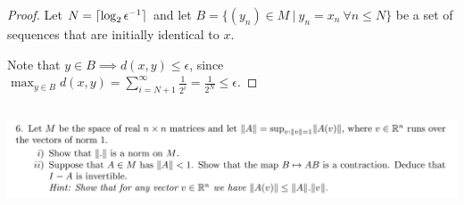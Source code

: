 \documentclass[12pt]{article}
\begin{document}
\begin{enumerate}[label=(\roman*)]
\begin{proof}
    Let $N = \lceil\log_2 \epsilon^{-1}\rceil$ and let
    $B = \{(y_n) \in M ~|~ y_n = x_n ~ \forall n \leq N\}$ be a set of sequences that are initially
    identical to $x$.

    Note that $y \in B \implies d(x, y) \leq \epsilon$, since
    $
      \max_{y \in B} d(x, y)
      = \sum_{i=N+1}^\infty \frac{1}{2^i}
      = \frac{1}{2^N}
      \leq \epsilon.
    $




  \end{proof}
\end{enumerate}


\newpage
\subsection{}



\begin{mdframed}
\includegraphics[width=400pt]{img/oxford-a2-2-6.png}
\end{mdframed}
\end{document}
